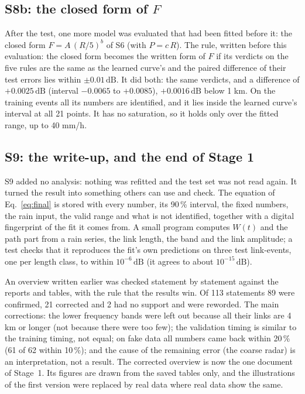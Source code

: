 \documentclass[11pt,a4paper]{article}
\newcommand{\dB}{\,\mathrm{dB}}
\begin{document}
\subsection{S8b: the closed form of $F$}
\label{sec:s8b}

After the test, one more model was evaluated that had been fitted before it: the closed form $F = A\,(R/5)^b$ of S6
(with $P = c\,R$). The rule, written before this evaluation: the closed form becomes the written form of $F$ if its
verdicts on the five rules are the same as the learned curve's and the paired difference of their test errors lies
within $\pm 0.01\dB$. It did both: the same verdicts, and a difference of $+0.0025\dB$ (interval $-0.0065$ to
$+0.0085$), $+0.0016\dB$ below 1 km. On the training events all its numbers are identified, and it lies inside the
learned curve's interval at all 21 points. It has no saturation, so it holds only over the fitted range, up to
40 mm/h.

\subsection{S9: the write-up, and the end of Stage 1}
\label{sec:s9}

S9 added no analysis: nothing was refitted and the test set was not read again. It turned the result into something
others can use and check. The equation of Eq.~\eqref{eq:final} is stored with every number, its 90\,\% interval, the
fixed numbers, the rain input, the valid range and what is not identified, together with a digital fingerprint of the
fit it comes from. A small program computes $W(t)$ and the path part from a rain series, the link length, the band and
the link amplitude; a test checks that it reproduces the fit's own predictions on three test link-events, one per
length class, to within $10^{-6}\dB$ (it agrees to about $10^{-15}\dB$).

An overview written earlier was checked statement by statement against the reports and tables, with the rule that
the results win. Of 113 statements 89 were confirmed, 21 corrected and 2 had no support and were reworded. The main
corrections: the lower frequency bands were left out because all their links are 4 km or longer (not because there
were too few); the validation timing is similar to the training timing, not equal; on fake data all numbers came back
within 20\,\% (61 of 62 within 10\,\%); and the cause of the remaining error (the coarse radar) is an interpretation,
not a result. The corrected overview is now the one document of Stage~1. Its figures are drawn from the saved tables
only, and the illustrations of the first version were replaced by real data where real data show the same.
\end{document}
